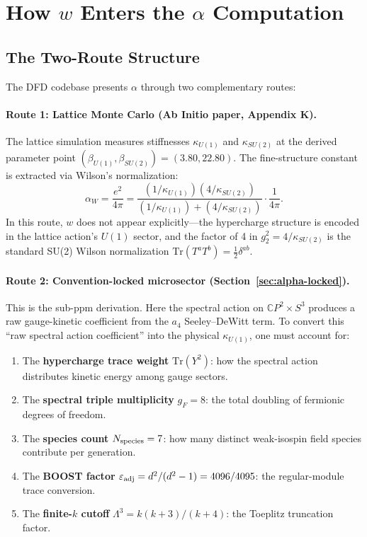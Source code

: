 \documentclass[11pt]{article}
\begin{document}
\section{How $w$ Enters the $\alpha$ Computation}

\subsection{The Two-Route Structure}

The DFD codebase presents $\alpha$ through two complementary routes:

\paragraph{Route 1: Lattice Monte Carlo (Ab Initio paper, Appendix K).}
The lattice simulation measures stiffnesses $\kappa_{U(1)}$ and $\kappa_{SU(2)}$
at the derived parameter point $(\beta_{U(1)}, \beta_{SU(2)}) = (3.80, 22.80)$.
The fine-structure constant is extracted via Wilson's normalization:
\begin{equation}\label{eq:alpha-lattice}
\alpha_W = \frac{e^2}{4\pi}
= \frac{(1/\kappa_{U(1)})(4/\kappa_{SU(2)})}
       {(1/\kappa_{U(1)}) + (4/\kappa_{SU(2)})}
\cdot \frac{1}{4\pi}.
\end{equation}
In this route, $w$ does not appear explicitly---the hypercharge structure is
encoded in the lattice action's $U(1)$ sector, and the factor of 4 in
$g_2^2 = 4/\kappa_{SU(2)}$ is the standard SU(2) Wilson normalization
$\mathrm{Tr}(T^a T^b) = \tfrac{1}{2}\delta^{ab}$.

\paragraph{Route 2: Convention-locked microsector
(Section~\ref*{sec:alpha-locked}).}
This is the sub-ppm derivation.  Here the spectral action on
$\mathbb{C}P^2 \times S^3$ produces a raw gauge-kinetic coefficient from
the $a_4$ Seeley--DeWitt term.  To convert this ``raw spectral action
coefficient'' into the physical $\kappa_{U(1)}$, one must account for:

\begin{enumerate}
\item The \textbf{hypercharge trace weight} $\mathrm{Tr}(Y^2)$: how the
      spectral action distributes kinetic energy among gauge sectors.
\item The \textbf{spectral triple multiplicity} $g_F = 8$: the total
      doubling of fermionic degrees of freedom.
\item The \textbf{species count} $N_{\rm species} = 7$: how many distinct
      weak-isospin field species contribute per generation.
\item The \textbf{BOOST factor} $\varepsilon_{\rm adj} = d^2/(d^2 - 1)
      = 4096/4095$: the regular-module trace conversion.
\item The \textbf{finite-$k$ cutoff} $\Lambda^3 = k(k+3)/(k+4)$:
      the Toeplitz truncation factor.
\end{enumerate}
\end{document}
